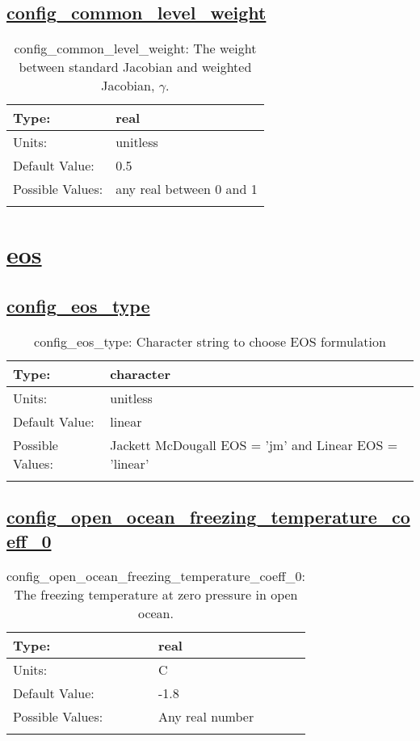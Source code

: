 \subsection[config\_common\_level\_weight]{\hyperref[sec:nm_tab_pressure_gradient]{config\_common\_level\_weight}}
\label{subsec:nm_sec_config_common_level_weight}
\begin{center}
\begin{longtable}{| p{2.0in} || p{4.0in} |}
    \hline
    Type: & real \\
    \hline
    Units: & \si{unitless} \\
    \hline
    Default Value: & 0.5 \\
    \hline
    Possible Values: & any real between 0 and 1 \\
    \hline
    \caption{config\_common\_level\_weight: The weight between standard Jacobian and weighted Jacobian, $\gamma$.}
\end{longtable}
\end{center}
\section[eos]{\hyperref[sec:nm_tab_eos]{eos}}
\label{sec:nm_sec_eos}
\subsection[config\_eos\_type]{\hyperref[sec:nm_tab_eos]{config\_eos\_type}}
\label{subsec:nm_sec_config_eos_type}
\begin{center}
\begin{longtable}{| p{2.0in} || p{4.0in} |}
    \hline
    Type: & character \\
    \hline
    Units: & \si{unitless} \\
    \hline
    Default Value: & linear \\
    \hline
    Possible Values: & Jackett McDougall EOS = 'jm' and Linear EOS = 'linear' \\
    \hline
    \caption{config\_eos\_type: Character string to choose EOS formulation}
\end{longtable}
\end{center}
\subsection[config\_open\_ocean\_freezing\_temperature\_coeff\_0]{\hyperref[sec:nm_tab_eos]{config\_open\_ocean\_freezing\_temperature\_coeff\_0}}
\label{subsec:nm_sec_config_open_ocean_freezing_temperature_coeff_0}
\begin{center}
\begin{longtable}{| p{2.0in} || p{4.0in} |}
    \hline
    Type: & real \\
    \hline
    Units: & \si{C} \\
    \hline
    Default Value: & -1.8 \\
    \hline
    Possible Values: & Any real number \\
    \hline
    \caption{config\_open\_ocean\_freezing\_temperature\_coeff\_0: The freezing temperature at zero pressure in open ocean.}
\end{longtable}
\end{center}
